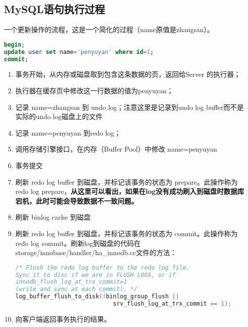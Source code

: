 \documentclass[../../../interview-questions.tex]{subfiles}
\begin{document}
\subsection{MySQL语句执行过程}

一个更新操作的流程，这是一个简化的过程（name原值是zhangsan）。

\begin{lstlisting}[language=SQL]
begin;
update user set name='penyuyan' where id=1;
commit;
\end{lstlisting}

\begin{enumerate}
    \item {事务开始，从内存或磁盘取到包含这条数据的页，返回给Server 的执行器；}
    \item {执行器在缓存页中修改这一行数据的值为penyuyan；}
    \item {记录 name=zhangsan 到 undo log；注意这里是记录到undo log buffer而不是实际的undo log磁盘上的文件}
    \item {记录 name=penyuyan 到redo log；}
    \item {调用存储引擎接口，在内存（Buffer Pool）中修改 name=penyuyan}
    \item {事务提交}
    \item {刷新 redo log buffer 到磁盘，并标记该事务的状态为 prepare。此操作称为 redo log prepare}，\textbf{从这里可以看出，如果在log没有成功刷入到磁盘时数据库宕机，此时可能会导致数据不一致问题。}
    \item {刷新 binlog cache 到磁盘}
    \item {刷新 redo log buffer 到磁盘，并标记该事务的状态为 commit。此操作称为 redo log commit。}刷新log到磁盘的代码在storage/innobase/handler/ha\_innodb.cc文件的方法：
    
\begin{lstlisting}[language=C]
/* Flush the redo log buffer to the redo log file.
Sync it to disc if we are in FLUSH LOGS, or if
innodb_flush_log_at_trx_commit=1
(write and sync at each commit). */
log_buffer_flush_to_disk(!binlog_group_flush ||
                            srv_flush_log_at_trx_commit == 1);
\end{lstlisting}


    \item {向客户端返回事务执行的结果。}
\end{enumerate}
\end{document}
